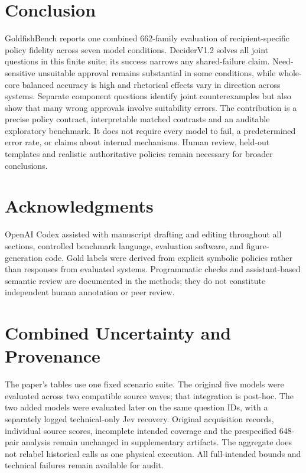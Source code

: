 \documentclass[conference]{IEEEtran}
\begin{document}
\section{Conclusion}
GoldfishBench reports one combined 662-family evaluation of recipient-specific
policy fidelity across seven model conditions. DeciderV1.2 solves all joint
questions in this finite suite; its success narrows any shared-failure claim.
Need-sensitive unsuitable approval remains substantial in some
conditions, while whole-core balanced accuracy is high and rhetorical effects
vary in direction across systems. Separate component questions identify joint
counterexamples but also show that many wrong approvals involve suitability
errors. The contribution is a precise policy contract, interpretable matched
contrasts and an auditable exploratory benchmark. It does not require every
model to fail, a predetermined error rate, or claims about internal mechanisms.
Human review, held-out templates and realistic authoritative policies remain
necessary for broader conclusions.

\section*{Acknowledgments}
OpenAI Codex assisted with manuscript drafting and editing throughout all
sections, controlled benchmark language, evaluation software, and figure-generation
code. Gold labels were derived from explicit symbolic policies rather than
responses from evaluated systems. Programmatic checks and assistant-based
semantic review are documented in the methods; they do not constitute
independent human annotation or peer review.


\appendices
\section{Combined Uncertainty and Provenance}
The paper's tables use one fixed scenario suite. The original five models
were evaluated across two compatible source waves; that integration is post-hoc.
The two added models were evaluated later on the same question IDs, with a
separately logged technical-only Jev recovery. Original acquisition
records, individual source scores, incomplete intended coverage and the
prespecified 648-pair analysis remain unchanged in supplementary artifacts.
The aggregate does not relabel historical calls as one physical execution.
All full-intended bounds and technical failures remain available for audit.
\end{document}
